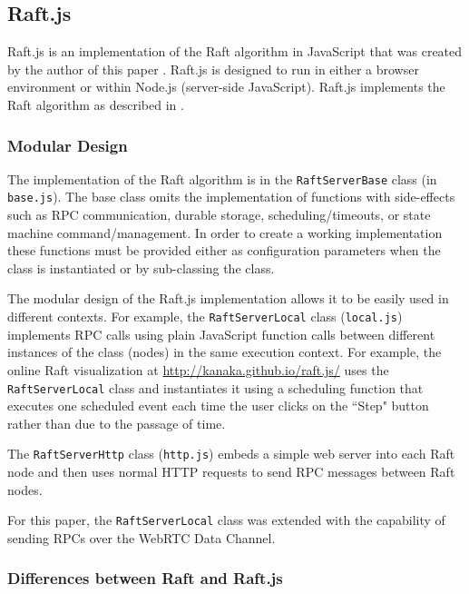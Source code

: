 \documentclass[9pt]{extarticle}
\begin{document}
\begin{multicols}{2}

\subsection{Raft.js}

Raft.js is an implementation of the Raft algorithm in JavaScript that
was created by the author of this paper \cite{raft.js}.  Raft.js is
designed to run in either a browser environment or within Node.js
(server-side JavaScript). Raft.js implements the Raft algorithm as
described in \cite[Consensus:~Diego]{raft_thesis:ongaro14}.

\subsubsection{Modular Design}

The implementation of the Raft algorithm is in the
\texttt{RaftServerBase} class (in \texttt{base.js}). The base class
omits the implementation of functions with side-effects such as RPC
communication, durable storage, scheduling/timeouts, or state machine
command/management. In order to create a working implementation these
functions must be provided either as configuration parameters when the
class is instantiated or by sub-classing the class.

The modular design of the Raft.js implementation allows it to be
easily used in different contexts. For example, the \texttt{RaftServerLocal}
class (\texttt{local.js}) implements RPC calls using plain JavaScript function
calls between different instances of the class (nodes) in the same
execution context. For example, the online Raft visualization at
\href{http://kanaka.github.io/raft.js/}{http://kanaka.github.io/raft.js/}
\cite{raft.js:visualization} uses the \texttt{RaftServerLocal} class
and instantiates it using a scheduling function that executes one
scheduled event each time the user clicks on the ``Step" button rather
than due to the passage of time.

The \texttt{RaftServerHttp} class (\texttt{http.js}) embeds a simple
web server into each Raft node and then uses normal HTTP requests to
send RPC messages between Raft nodes.

For this paper, the \texttt{RaftServerLocal} class was extended with
the capability of sending RPCs over the WebRTC Data Channel.

\subsubsection{Differences between Raft and Raft.js}


\end{multicols}
\end{document}

